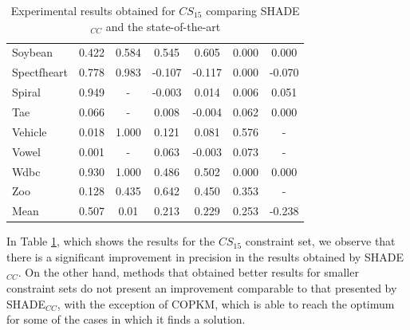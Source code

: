 \documentclass[review]{elsarticle}
\begin{document}
\begin{table}[!h]
{\begin{tabular}{lcccccc}
			Soybean & 0.422 & 0.584 & 0.545 & 0.605 & 0.000 & 0.000 \\
			Spectfheart & 0.778 & 0.983 & -0.107 & -0.117 & 0.000 & -0.070 \\
			Spiral & 0.949 & - & -0.003 & 0.014 & 0.006 & 0.051 \\
			Tae & 0.066 & - & 0.008 & -0.004 & 0.062 & 0.000 \\
			Vehicle & 0.018 & 1.000 & 0.121 & 0.081 & 0.576 & - \\
			Vowel & 0.001 & - & 0.063 & -0.003 & 0.073 & - \\
			Wdbc & 0.930 & 1.000 & 0.486 & 0.502 & 0.000 & 0.000 \\
			Zoo & 0.128 & 0.435 & 0.642 & 0.450 & 0.353 & - \\
			\hline
			Mean  & 0.507 & 0.01 & 0.213 & 0.229 & 0.253 & -0.238 \\
			\hline
		\end{tabular}}
		
	\caption{Experimental results obtained for $CS_{15}$ comparing SHADE$_{CC}$ and the state-of-the-art}
	\label{tab:results15SOTA}
\end{table}

In Table \ref{tab:results15SOTA}, which shows the results for the $CS_{15}$ constraint set, we observe that there is a significant improvement in precision in the results obtained by SHADE$_{CC}$. On the other hand, methods that obtained better results for smaller constraint sets do not present an improvement comparable to that presented by SHADE$_{CC}$, with the exception of COPKM, which is able to reach the optimum for some of the cases in which it finds a solution.
\end{document}
